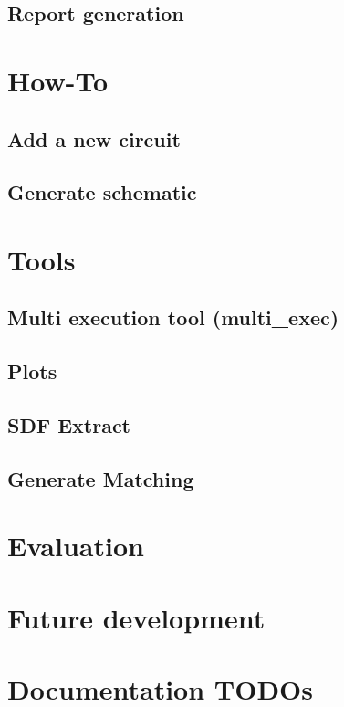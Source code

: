 \documentclass[a4,12pt,hidelinks]{article}
\newcommand{\multiexec}{multi\_exec}
\begin{document}
\subsection{Report generation}
\label{sec:man-configuration-report}


\section{How-To}
\label{sec:man-howto}

\subsection{Add a new circuit}
\label{sec:man-howto-circuit}


\subsection{Generate schematic}
\label{sec:man-howto-schematic}


\section{Tools}
\label{sec:man-tools}

\subsection{Multi execution tool (\multiexec)}
\label{sec:man-tools-multiexec}


\subsection{Plots}
\label{sec:man-plots}


\subsection{SDF Extract}
\label{sec:man-sdf-extract}


\subsection{Generate Matching}
\label{sec:man-generate-matching}


\section{Evaluation}
\label{sec:man-evaluation}


\section{Future development}
\label{sec:man-future-development}


\section{Documentation TODOs}
\label{sec:documentation-todos}





\end{document}
